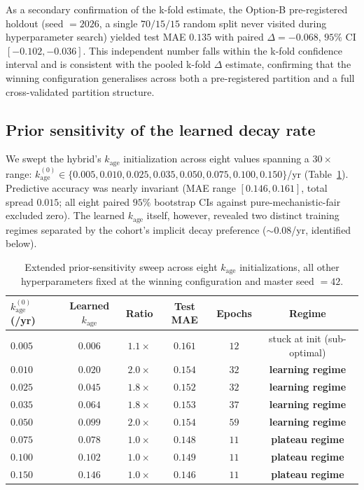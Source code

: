 As a secondary confirmation of the k-fold estimate, the Option-B pre-registered holdout (seed $=2026$, a single $70/15/15$ random split never visited during hyperparameter search) yielded test MAE $0.135$ with paired $\Delta = -0.068$, $95\%$ CI $[-0.102, -0.036]$. This independent number falls within the k-fold confidence interval and is consistent with the pooled k-fold $\Delta$ estimate, confirming that the winning configuration generalises across both a pre-registered partition and a full cross-validated partition structure.

\subsection{Prior sensitivity of the learned decay rate}\label{sec:prior_sensitivity}

We swept the hybrid's $k_\text{age}$ initialization across eight values spanning a $30\times$ range: $k_\text{age}^{(0)} \in \{0.005, 0.010, 0.025, 0.035, 0.050, 0.075, 0.100, 0.150\}$/yr (Table~\ref{tab:p11_prior_sens}). Predictive accuracy was nearly invariant (MAE range $[0.146, 0.161]$, total spread $0.015$; all eight paired $95\%$ bootstrap CIs against pure-mechanistic-fair excluded zero). The learned $k_\text{age}$ itself, however, revealed two distinct training regimes separated by the cohort's implicit decay preference ($\sim$$0.08$/yr, identified below).

\begin{table}[ht]
\centering
\caption{Extended prior-sensitivity sweep across eight $k_\text{age}$ initializations, all other hyperparameters fixed at the winning configuration and master seed $=42$.}
\label{tab:p11_prior_sens}
\begin{tabular}{lccccc}
\toprule
$k_\text{age}^{(0)}$ (/yr) & Learned $k_\text{age}$ & Ratio & Test MAE & Epochs & Regime \\
\midrule
$0.005$ & $0.006$ & $1.1\times$ & $0.161$ & $12$ & stuck at init (sub-optimal) \\
$0.010$ & $0.020$ & $2.0\times$ & $0.154$ & $32$ & \textbf{learning regime} \\
$0.025$ & $0.045$ & $1.8\times$ & $0.152$ & $32$ & \textbf{learning regime} \\
$0.035$ & $0.064$ & $1.8\times$ & $0.153$ & $37$ & \textbf{learning regime} \\
$0.050$ & $0.099$ & $2.0\times$ & $0.154$ & $59$ & \textbf{learning regime} \\
$0.075$ & $0.078$ & $1.0\times$ & $0.148$ & $11$ & \textbf{plateau regime} \\
$0.100$ & $0.102$ & $1.0\times$ & $0.149$ & $11$ & \textbf{plateau regime} \\
$0.150$ & $0.146$ & $1.0\times$ & $0.146$ & $11$ & \textbf{plateau regime} \\
\bottomrule
\end{tabular}
\end{table}

